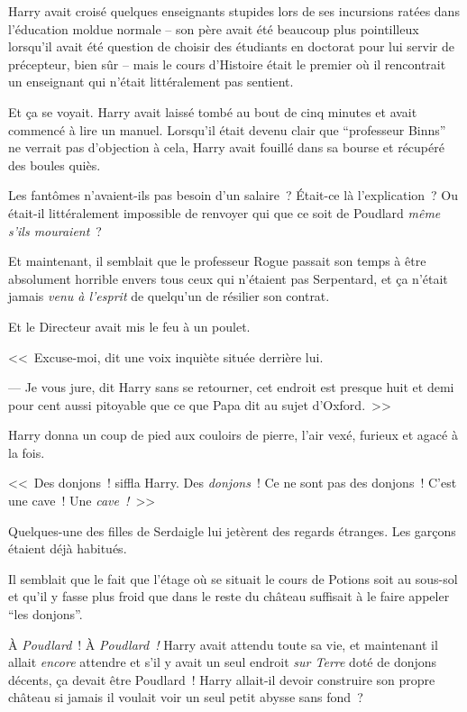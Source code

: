 Harry avait croisé quelques enseignants stupides lors de ses incursions ratées dans l'éducation moldue normale -- son père avait été beaucoup plus pointilleux lorsqu'il avait été question de choisir des étudiants en doctorat pour lui servir de précepteur, bien sûr -- mais le cours d'Histoire était le premier où il rencontrait un enseignant qui n'était littéralement pas sentient.

Et ça se voyait. Harry avait laissé tombé au bout de cinq minutes et avait commencé à lire un manuel. Lorsqu'il était devenu clair que “professeur Binns” ne verrait pas d'objection à cela, Harry avait fouillé dans sa bourse et récupéré des boules quiès.

Les fantômes n'avaient-ils pas besoin d'un salaire~? Était-ce là l'explication~? Ou était-il littéralement impossible de renvoyer qui que ce soit de Poudlard \emph{même s'ils mouraient}~?

Et maintenant, il semblait que le professeur Rogue passait son temps à être absolument horrible envers tous ceux qui n'étaient pas Serpentard, et ça n'était jamais \emph{venu à l'esprit} de quelqu'un de résilier son contrat.

Et le Directeur avait mis le feu à un poulet.

<<~Excuse-moi, dit une voix inquiète située derrière lui.

--- Je vous jure, dit Harry sans se retourner, cet endroit est presque huit et demi pour cent aussi pitoyable que ce que Papa dit au sujet d'Oxford.~>>

\later

Harry donna un coup de pied aux couloirs de pierre, l'air vexé, furieux et agacé à la fois.

<<~Des donjons~! siffla Harry. Des \emph{donjons}~! Ce ne sont pas des donjons~! C'est une cave~! Une \emph{cave~!}~>>

Quelques-une des filles de Serdaigle lui jetèrent des regards étranges. Les garçons étaient déjà habitués.

Il semblait que le fait que l'étage où se situait le cours de Potions soit au sous-sol et qu'il y fasse plus froid que dans le reste du château suffisait à le faire appeler “les donjons”.

À \emph{Poudlard}~! À \emph{Poudlard~!} Harry avait attendu toute sa vie, et maintenant il allait \emph{encore} attendre et s'il y avait un seul endroit \emph{sur Terre} doté de donjons décents, ça devait être Poudlard~! Harry allait-il devoir construire son propre château si jamais il voulait voir un seul petit abysse sans fond~?

